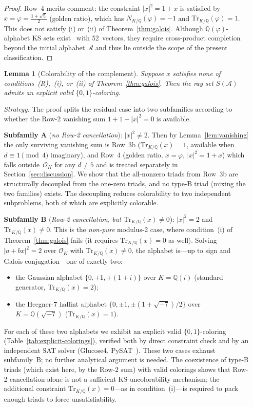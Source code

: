 \documentclass[12pt,a4paper]{article}
\newtheorem{lemma}{Lemma}
\newcommand{\Q}{\mathbb{Q}}
\newcommand{\Norm}[1]{N_{K/\Q}\!\left(#1\right)}
\newcommand{\Tr}[1]{\mathrm{Tr}_{K/\Q}\!\left(#1\right)}
\begin{document}
\begin{proof}
Row~4 merits comment: the constraint $|x|^2 = 1 + x$ is satisfied by
$x = \varphi = \tfrac{1+\sqrt{5}}{2}$ (golden ratio), which has
$\Norm{\varphi} = -1$ and $\Tr{\varphi} = 1$.  This does not satisfy
(i) or~(ii) of Theorem~\ref{thm:galois}.  Although
$\Q(\varphi)$-alphabet KS sets exist~\cite{Kernaghan2026islands} with
52~vectors, they require cross-product completion beyond the initial
alphabet $\mathcal{A}$ and thus lie outside the scope of the present
classification.
\end{proof}

\begin{lemma}[Colorability of the complement]\label{lem:sparsity}
Suppose $x$ satisfies none of conditions~\emph{(R)},~\emph{(i)},
or~\emph{(ii)} of Theorem~\ref{thm:galois}.  Then the ray set
$S(\mathcal{A})$ admits an explicit valid $\{0,1\}$-coloring.
\end{lemma}

\noindent\textit{Strategy.}
The proof splits the residual case into two subfamilies according to
whether the Row-2 vanishing sum $1 + 1 - |x|^2 = 0$ is available.

\smallskip
\noindent\textbf{Subfamily A} (\emph{no Row-2 cancellation}):
$|x|^2 \neq 2$.  Then by Lemma~\ref{lem:vanishing} the only surviving
vanishing sum is Row~3b ($\Tr{x} = 1$, available when $d \equiv 1
\pmod{4}$ imaginary), and Row~4 (golden ratio, $x = \varphi$,
$|x|^2 = 1 + x$) which falls outside~$\mathcal{O}_K$ for any
$d \neq 5$ and is treated separately in Section~\ref{sec:discussion}.
We show that the all-nonzero triads from Row~3b are structurally
decoupled from the one-zero triads, and no type-B triad (mixing the
two families) exists.  The decoupling reduces colorability to two
independent subproblems, both of which are explicitly colorable.

\smallskip
\noindent\textbf{Subfamily B} (\emph{Row-2 cancellation, but
$\Tr{x} \neq 0$}): $|x|^2 = 2$ and $\Tr{x} \neq 0$.  This is the
\emph{non-pure} modulus-2 case, where condition~(i) of
Theorem~\ref{thm:galois} fails (it requires $\Tr{x} = 0$ as well).
Solving $|a + b x|^2 = 2$ over $\mathcal{O}_K$ with $\Tr{x} \neq 0$,
the alphabet is---up to sign and Galois-conjugation---one of exactly
two:
\begin{itemize}
  \item the Gaussian alphabet $\{0,\pm 1,\pm(1+i)\}$ over
    $K = \Q(i)$ (standard generator, $\Tr{x} = 2$);
  \item the Heegner-7 halfint alphabet $\{0,\pm 1,\pm(1+\sqrt{-7})/2\}$
    over $K = \Q(\sqrt{-7})$ ($\Tr{x} = 1$).
\end{itemize}
For each of these two alphabets we exhibit an explicit valid
$\{0,1\}$-coloring (Table~\ref{tab:explicit-colorings}), verified
both by direct constraint check and by an independent SAT solver
(Glucose4, PySAT~\cite{AudemardSimon2018}).  These two cases
exhaust subfamily~B; no further analytical argument is needed.
The coexistence of type-B triads (which exist here, by the Row-2
sum) with valid colorings shows that Row-2 cancellation alone is
not a sufficient KS-uncolorability mechanism; the additional
constraint $\Tr{x} = 0$---as in condition~(i)---is required to
pack enough triads to force unsatisfiability.
\end{document}

